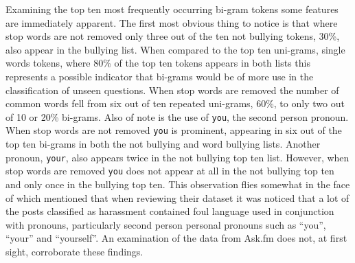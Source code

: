 Examining the top ten most frequently occurring bi-gram tokens some features are immediately apparent. The first most obvious thing to notice is that where stop words are not removed only three out of the ten not bullying tokens, 30\%, also appear in the bullying list. When compared to the top ten uni-grams, single words tokens, where 80\% of the top ten tokens appears in both lists this represents a possible indicator that bi-grams would be of more use in the classification of unseen questions. When stop words are removed the number of common words fell from six out of ten repeated uni-grams, 60\%, to only two out of 10 or 20\% bi-grams. Also of note is the use of \verb|you|, the second person pronoun. When stop words are not removed \verb|you| is prominent, appearing in six out of the top ten bi-grams in both the not bullying and word bullying lists. Another pronoun, \verb|your|, also appears twice in the not bullying top ten list. However, when stop words are removed \verb|you| does not appear at all in the not bullying top ten and only once in the bullying top ten. This observation flies somewhat in the face of \citet{yin_detection_2009} which mentioned that when reviewing their dataset it was noticed that a lot of the posts classified as harassment contained foul language used in conjunction with pronouns, particularly second person personal pronouns such as ``you'', ``your'' and ``yourself''. An examination of the data from Ask.fm does not, at first sight, corroborate these findings. 

